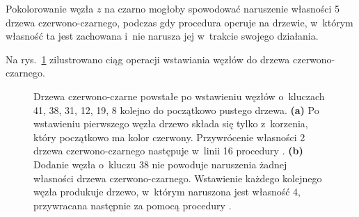 
\exercise %
Pokolorowanie węzła $z$ na czarno mogłoby spowodować naruszenie własności 5 drzewa czerwono-czarnego, podczas gdy procedura  operuje na drzewie, w~którym własność ta jest zachowana i~nie narusza jej w~trakcie swojego działania.

\exercise %
Na rys.\ \ref{fig:13.3-2} zilustrowano ciąg operacji wstawiania węzłów do drzewa czerwono-czarnego.
\begin{figure}[ht]
	\centering 
	\caption{Drzewa czerwono-czarne powstałe po wstawieniu węzłów o~kluczach 41, 38, 31, 12, 19, 8 kolejno do początkowo pustego drzewa.
	{\sffamily\bfseries(a)} Po wstawieniu pierwszego węzła drzewo składa się tylko z~korzenia, który początkowo ma kolor czerwony.
	Przywrócenie własności 2 drzewa czerwono-czarnego następuje w~linii 16 procedury .
	{\sffamily\bfseries(b)} Dodanie węzła o~kluczu 38 nie powoduje naruszenia żadnej własności drzewa czerwono-czarnego.
	{\sffamily\bfseries{}} Wstawienie każdego kolejnego węzła produkuje drzewo, w~którym naruszona jest własność 4, przywracana następnie za pomocą procedury .} \label{fig:13.3-2}
\end{figure}

\exercise %
\exercise %
\exercise %
\exercise %
